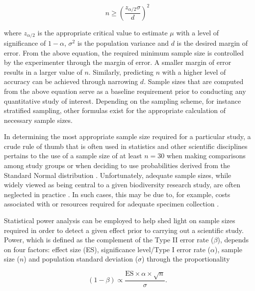 \begin{equation}
n \geq \left(\frac{z_{\alpha/2}\sigma}{d}\right)^2
\end{equation}



\noindent where $z_{\alpha/2}$ is the appropriate critical value to estimate $\mu$ with a level of significance of $1 - \alpha$, $\sigma^2$ is the population variance and $d$ is the desired margin of error. From the above equation, the required minimum sample size is controlled by the experimenter through the margin of error. A smaller margin of error results in a larger value of $n$. Similarly, predicting $n$ with a higher level of accuracy can be achieved through narrowing $d$. Sample sizes that are computed from the above equation serve as a baseline requirement prior to conducting any quantitative study of interest. Depending on the sampling scheme, for instance stratified sampling, other formulas exist for the appropriate calculation of necessary sample sizes.



In determining the most appropriate sample size required for a particular study, a crude rule of thumb that is often used in statistics and other scientific disciplines pertains to the use of a sample size of at least $n = 30$ when making comparisons among study groups or when deciding to use probabilities derived from the Standard Normal distribution \cite{cohen1990things}. Unfortunately, adequate sample sizes, while widely viewed as being central to a given biodiversity research study, are often neglected in practice \cite{lenth2001some}. In such cases, this may be due to, for example, costs associated with or resources required for adequate specimen collection \cite{cameron2006will, hortal2005ed, muirhead2008identifying}.



Statistical power analysis can be employed to help shed light on sample sizes required in order to detect a given effect prior to carrying out a scientific study. Power, which is defined as the complement of the Type II error rate ($\beta$), depends on four factors: effect size (ES), significance level/Type I error rate ($\alpha$), sample size ($n$) and population standard deviation ($\sigma$) through the proportionality \cite{di2003much}

\begin{equation}
(1 - \beta) \propto \frac{\textrm{ES} \times \alpha \times \sqrt{n}}{\sigma}.
\end{equation}


